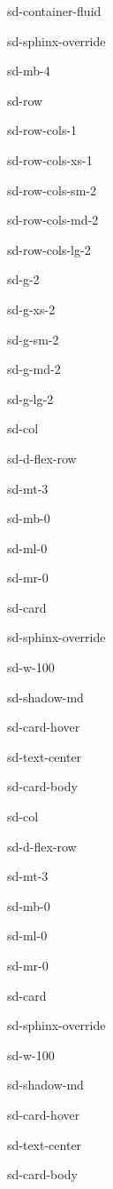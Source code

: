 \documentclass[letterpaper,10pt,english]{jupyterBook}
\begin{document}
\begin{sphinxuseclass}{sd-container-fluid}
\begin{sphinxuseclass}{sd-sphinx-override}
\begin{sphinxuseclass}{sd-mb-4}
\begin{sphinxuseclass}{sd-row}
\begin{sphinxuseclass}{sd-row-cols-1}
\begin{sphinxuseclass}{sd-row-cols-xs-1}
\begin{sphinxuseclass}{sd-row-cols-sm-2}
\begin{sphinxuseclass}{sd-row-cols-md-2}
\begin{sphinxuseclass}{sd-row-cols-lg-2}
\begin{sphinxuseclass}{sd-g-2}
\begin{sphinxuseclass}{sd-g-xs-2}
\begin{sphinxuseclass}{sd-g-sm-2}
\begin{sphinxuseclass}{sd-g-md-2}
\begin{sphinxuseclass}{sd-g-lg-2}
\begin{sphinxuseclass}{sd-col}
\begin{sphinxuseclass}{sd-d-flex-row}
\begin{sphinxuseclass}{sd-mt-3}
\begin{sphinxuseclass}{sd-mb-0}
\begin{sphinxuseclass}{sd-ml-0}
\begin{sphinxuseclass}{sd-mr-0}
\begin{sphinxuseclass}{sd-card}
\begin{sphinxuseclass}{sd-sphinx-override}
\begin{sphinxuseclass}{sd-w-100}
\begin{sphinxuseclass}{sd-shadow-md}
\begin{sphinxuseclass}{sd-card-hover}
\begin{sphinxuseclass}{sd-text-center}
\begin{sphinxuseclass}{sd-card-body}
\end{sphinxuseclass}
\end{sphinxuseclass}
\end{sphinxuseclass}
\end{sphinxuseclass}
\end{sphinxuseclass}
\end{sphinxuseclass}
\end{sphinxuseclass}
\end{sphinxuseclass}
\end{sphinxuseclass}
\end{sphinxuseclass}
\end{sphinxuseclass}
\end{sphinxuseclass}
\end{sphinxuseclass}
\begin{sphinxuseclass}{sd-col}
\begin{sphinxuseclass}{sd-d-flex-row}
\begin{sphinxuseclass}{sd-mt-3}
\begin{sphinxuseclass}{sd-mb-0}
\begin{sphinxuseclass}{sd-ml-0}
\begin{sphinxuseclass}{sd-mr-0}
\begin{sphinxuseclass}{sd-card}
\begin{sphinxuseclass}{sd-sphinx-override}
\begin{sphinxuseclass}{sd-w-100}
\begin{sphinxuseclass}{sd-shadow-md}
\begin{sphinxuseclass}{sd-card-hover}
\begin{sphinxuseclass}{sd-text-center}
\begin{sphinxuseclass}{sd-card-body}

\end{sphinxuseclass}
\end{sphinxuseclass}
\end{sphinxuseclass}
\end{sphinxuseclass}
\end{sphinxuseclass}
\end{sphinxuseclass}
\end{sphinxuseclass}
\end{sphinxuseclass}
\end{sphinxuseclass}
\end{sphinxuseclass}
\end{sphinxuseclass}
\end{sphinxuseclass}
\end{sphinxuseclass}
\end{sphinxuseclass}
\end{sphinxuseclass}
\end{sphinxuseclass}
\end{sphinxuseclass}
\end{sphinxuseclass}
\end{sphinxuseclass}
\end{sphinxuseclass}
\end{sphinxuseclass}
\end{sphinxuseclass}
\end{sphinxuseclass}
\end{sphinxuseclass}
\end{sphinxuseclass}
\end{sphinxuseclass}
\end{sphinxuseclass}
\end{document}
